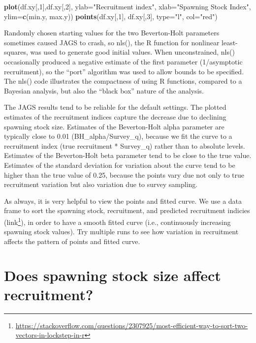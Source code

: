 \documentclass[
]{krantz}
\makeatletter
\newenvironment{Shaded}{\begin{snugshade}}{\end{snugshade}}
\newcommand{\AttributeTok}[1]{\textcolor[rgb]{0.27,0.27,0.27}{#1}}
\newcommand{\DecValTok}[1]{\textcolor[rgb]{0.06,0.06,0.06}{#1}}
\newcommand{\FunctionTok}[1]{\textcolor[rgb]{0.27,0.27,0.27}{\textbf{#1}}}
\newcommand{\NormalTok}[1]{#1}
\newcommand{\StringTok}[1]{\textcolor[rgb]{0.5,0.5,0.5}{#1}}
\renewcommand{\href}[2]{#2\footnote{\url{#1}}}
\newenvironment{kframe}{%
\medskip{}
\setlength{\fboxsep}{.8em}
 \def\at@end@of@kframe{}%
 \ifinner\ifhmode%
  \def\at@end@of@kframe{\end{minipage}}%
  \begin{minipage}{\columnwidth}%
 \fi\fi%
 \def\FrameCommand##1{\hskip\@totalleftmargin \hskip-\fboxsep
 \colorbox{shadecolor}{##1}\hskip-\fboxsep
     \hskip-\linewidth \hskip-\@totalleftmargin \hskip\columnwidth}%
 \MakeFramed {\advance\hsize-\width
   \@totalleftmargin\z@ \linewidth\hsize
   \@setminipage}}%
 {\par\unskip\endMakeFramed%
 \at@end@of@kframe}
\renewenvironment{Shaded}{\begin{kframe}}{\end{kframe}}
\makeatother
\begin{document}
\begin{Shaded}
\begin{Highlighting}[]
\FunctionTok{plot}\NormalTok{(df.xy[,}\DecValTok{1}\NormalTok{],df.xy[,}\DecValTok{2}\NormalTok{], }\AttributeTok{ylab=}\StringTok{"Recruitment index"}\NormalTok{,}
     \AttributeTok{xlab=}\StringTok{"Spawning Stock Index"}\NormalTok{, }\AttributeTok{ylim=}\FunctionTok{c}\NormalTok{(min.y, max.y))}
\FunctionTok{points}\NormalTok{(df.xy[,}\DecValTok{1}\NormalTok{], df.xy[,}\DecValTok{3}\NormalTok{], }\AttributeTok{type=}\StringTok{"l"}\NormalTok{, }\AttributeTok{col=}\StringTok{"red"}\NormalTok{)}
\end{Highlighting}
\end{Shaded}

Randomly chosen starting values for the two Beverton-Holt parameters sometimes caused JAGS to crash, so nls(), the R function for nonlinear least-squares, was used to generate good initial values. When unconstrained, nls() occasionally produced a negative estimate of the first parameter (1/asymptotic recruitment), so the ``port'' algorithm was used to allow bounds to be specified. The nls() code illustrates the compactness of using R functions, compared to a Bayesian analysis, but also the ``black box'' nature of the analysis.

The JAGS results tend to be reliable for the default settings. The plotted estimates of the recruitment indices capture the decrease due to declining spawning stock size. Estimates of the Beverton-Holt alpha parameter are typically close to 0.01 (BH\_alpha/Survey\_q), because we fit the curve to a recruitment index (true recruitment * Survey\_q) rather than to absolute levels. Estimates of the Beverton-Holt beta parameter tend to be close to the true value. Estimates of the standard deviation for variation about the curve tend to be higher than the true value of 0.25, because the points vary due not only to true recruitment variation but also variation due to survey sampling.

As always, it is very helpful to view the points and fitted curve. We use a data frame to sort the spawning stock, recruitment, and predicted recruitment indicies (\href{https://stackoverflow.com/questions/2307925/most-efficient-way-to-sort-two-vectors-in-lockstep-in-r}{link}), in order to have a smooth fitted curve (i.e., continuously increasing spawning stock values). Try multiple runs to see how variation in recruitment affects the pattern of points and fitted curve.

\hypertarget{Recruit-DIC}{%
\section{Does spawning stock size affect recruitment?}\label{Recruit-DIC}}
\end{document}
